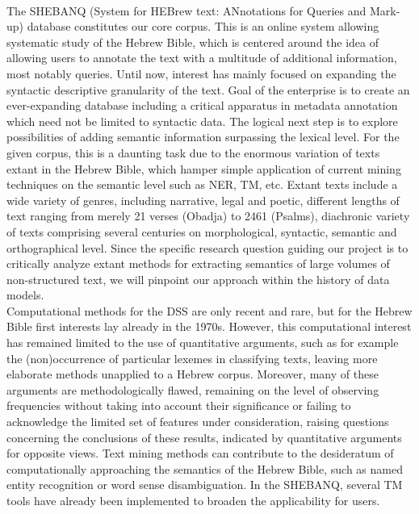 \documentclass[10pt,a4paper]{article}
\begin{document}
\\The SHEBANQ (System for HEBrew text: ANnotations for Queries and Mark-up) \cite{SHEB} database constitutes our core corpus. This is an online system allowing systematic study of the Hebrew Bible, which is centered around the idea of allowing users to annotate the text with a multitude of additional information, most notably queries. Until now, interest has mainly focused on expanding the syntactic descriptive granularity of the text. Goal of the enterprise is to create an ever-expanding database including a critical apparatus in metadata annotation which need not be limited to syntactic data. The logical next step is to explore possibilities of adding semantic information surpassing the lexical level. For the given corpus, this is a daunting task due to the enormous variation of texts extant in the Hebrew Bible, which hamper simple application of current mining techniques on the semantic level such as NER, TM, etc. Extant texts include a wide variety of genres, including narrative, legal and poetic, different lengths of text ranging from merely 21 verses (Obadja) to 2461 (Psalms), diachronic variety of texts comprising several centuries on morphological, syntactic, semantic and orthographical level. Since the specific research question guiding our project is to critically analyze extant methods for extracting semantics of large volumes of non-structured text, we will pinpoint our approach within the history of data models.
\\Computational methods for the DSS are only recent and rare, but for the Hebrew Bible first interests lay already in the 1970s. However, this computational interest has remained limited to the use of quantitative arguments, such as for example the (non)occurrence of particular lexemes in classifying texts, leaving more elaborate methods unapplied to a Hebrew corpus. Moreover, many of these arguments are methodologically flawed, remaining on the level of observing frequencies without taking into account their significance or failing to acknowledge the limited set of features under consideration, raising questions concerning the conclusions of these results, indicated by quantitative arguments for opposite views. Text mining methods can contribute to the desideratum of computationally approaching the semantics of  the Hebrew Bible, such as named entity recognition or word sense disambiguation. In the SHEBANQ, several TM tools have already been implemented to broaden the applicability for users. 
\end{document}
